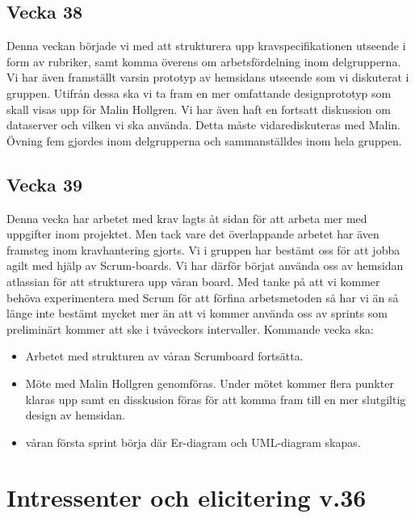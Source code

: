 \documentclass{article}
\begin{document}
    \subsection{Vecka 38}
    Denna veckan började vi med att strukturera upp kravspecifikationen utseende i form av rubriker, samt komma överens om arbetsfördelning inom delgrupperna. Vi har även framställt varsin prototyp av hemsidans utseende som vi diskuterat i gruppen. Utifrån dessa ska vi ta fram en mer omfattande designprototyp som skall visas upp för Malin Hollgren. Vi har även haft en fortsatt diskussion om dataserver och vilken vi ska använda. Detta måste vidarediskuteras med Malin. Övning fem gjordes inom delgrupperna och sammanställdes inom hela gruppen.
    
    \subsection{Vecka 39}
    Denna vecka har arbetet med krav lagts åt sidan för att arbeta mer med uppgifter inom projektet. Men tack vare det överlappande arbetet har även framsteg inom kravhantering gjorts. Vi i gruppen har bestämt oss för att jobba agilt med hjälp av Scrum-boards. Vi har därför börjat använda oss av hemsidan atlassian för att strukturera upp våran board. Med tanke på att vi kommer behöva experimentera med Scrum för att förfina arbetsmetoden så har vi än så länge inte bestämt mycket mer än att vi kommer använda oss av sprints som preliminärt kommer att ske i tvåveckors intervaller.
    Kommande vecka ska: \\ 
    \begin{itemize}
        \item Arbetet med strukturen av våran Scrumboard fortsätta.
        \item Möte med Malin Hollgren genomföras. Under mötet kommer flera 
        punkter klaras upp samt en disskusion föras för att komma fram till en mer slutgiltig design av hemsidan.
        \item våran första sprint börja där Er-diagram och UML-diagram skapas.
    \end{itemize}
  
    \newpage
    

\section{Intressenter och elicitering v.36}
\end{document}
